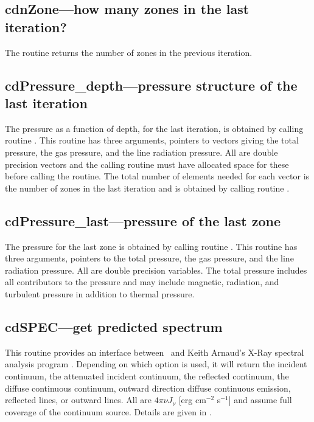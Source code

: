 \subsection{cdnZone---how many zones in the last iteration?}

The routine returns the number of zones in the previous iteration.

\subsection{cdPressure\_depth---pressure structure of the last iteration }

The pressure as a function of depth, for the last iteration, is obtained
by calling routine .  This routine has three arguments,
pointers to vectors giving the total pressure, the gas pressure, and the
line radiation pressure.  All are double precision vectors and the calling
routine must have allocated space for these before calling the routine.
The total number of elements needed for each vector is the number of zones
in the last iteration and is obtained by calling routine .

\subsection{cdPressure\_last---pressure of the last zone }

The pressure for the last zone is obtained by calling routine
.
This routine has three arguments, pointers to the total
pressure, the gas pressure, and the line radiation pressure.
All are double
precision variables.
The total pressure includes all contributors to the
pressure and may include magnetic, radiation, and turbulent pressure in
addition to thermal pressure.

\subsection{cdSPEC---get predicted spectrum}

This routine provides an interface between \Cloudy\ and Keith Arnaud's
X-Ray spectral analysis program .
Depending on which option is used,
it will return the incident continuum, the attenuated incident continuum,
the reflected continuum, the diffuse continuous continuum, outward direction
diffuse continuous emission, reflected lines, or outward lines.
All are
$4\pi \nu J_\nu$ [erg cm$^{-2}$ s$^{-1}$] and assume full coverage of the continuum source.
Details are given in .

